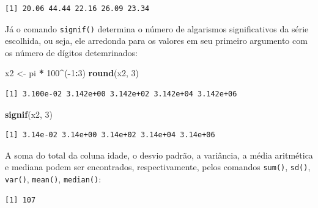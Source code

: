 \documentclass[12pt,portuguese,oneside]{book}
\newenvironment{Shaded}{\begin{snugshade}}{\end{snugshade}}
\newcommand{\KeywordTok}[1]{\textcolor[rgb]{0.13,0.29,0.53}{\textbf{#1}}}
\newcommand{\DecValTok}[1]{\textcolor[rgb]{0.00,0.00,0.81}{#1}}
\newcommand{\StringTok}[1]{\textcolor[rgb]{0.31,0.60,0.02}{#1}}
\newcommand{\CommentTok}[1]{\textcolor[rgb]{0.56,0.35,0.01}{\textit{#1}}}
\newcommand{\OperatorTok}[1]{\textcolor[rgb]{0.81,0.36,0.00}{\textbf{#1}}}
\newcommand{\NormalTok}[1]{#1}
\begin{document}
\begin{verbatim}
[1] 20.06 44.44 22.16 26.09 23.34
\end{verbatim}

Já o comando \texttt{signif()} determina o número de algarismos
significativos da série escolhida, ou seja, ele arredonda para os
valores em seu primeiro argumento com os número de dígitos detemrinados:

\begin{Shaded}
\begin{Highlighting}[]
\NormalTok{x2 <-}\StringTok{ }\NormalTok{pi }\OperatorTok{*}\StringTok{ }\DecValTok{100}\OperatorTok{^}\NormalTok{(}\OperatorTok{-}\DecValTok{1}\OperatorTok{:}\DecValTok{3}\NormalTok{)}
\KeywordTok{round}\NormalTok{(x2, }\DecValTok{3}\NormalTok{)}
\end{Highlighting}
\end{Shaded}

\begin{verbatim}
[1] 3.100e-02 3.142e+00 3.142e+02 3.142e+04 3.142e+06
\end{verbatim}

\begin{Shaded}
\begin{Highlighting}[]
\KeywordTok{signif}\NormalTok{(x2, }\DecValTok{3}\NormalTok{) }
\end{Highlighting}
\end{Shaded}

\begin{verbatim}
[1] 3.14e-02 3.14e+00 3.14e+02 3.14e+04 3.14e+06
\end{verbatim}

A soma do total da coluna idade, o desvio padrão, a variância, a média
aritmética e mediana podem ser encontrados, respectivamente, pelos
comandos \texttt{sum()}, \texttt{sd()}, \texttt{var()}, \texttt{mean()},
\texttt{median()}:

\begin{Shaded}
\end{Shaded}

\begin{verbatim}
[1] 107
\end{verbatim}

\begin{Shaded}
\end{Shaded}
\end{document}

